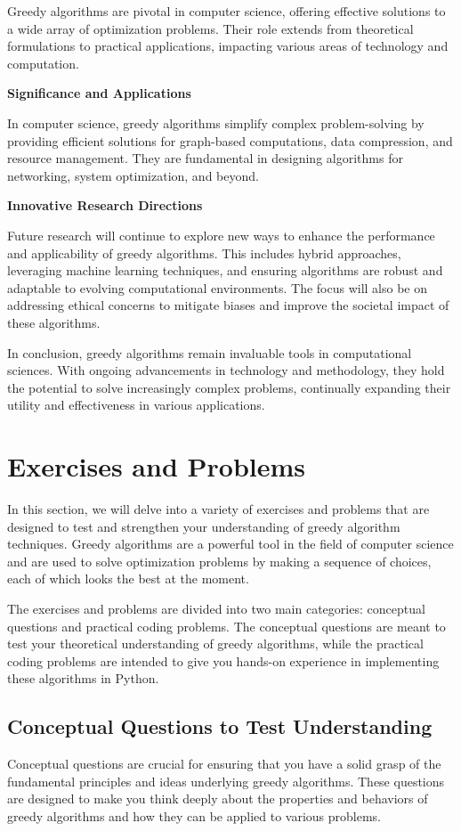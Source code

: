 \documentclass[12pt]{book} %
\begin{document}
Greedy algorithms are pivotal in computer science, offering effective solutions to a wide array of optimization problems. Their role extends from theoretical formulations to practical applications, impacting various areas of technology and computation.

\textbf{Significance and Applications}

In computer science, greedy algorithms simplify complex problem-solving by providing efficient solutions for graph-based computations, data compression, and resource management. They are fundamental in designing algorithms for networking, system optimization, and beyond.

\textbf{Innovative Research Directions}

Future research will continue to explore new ways to enhance the performance and applicability of greedy algorithms. This includes hybrid approaches, leveraging machine learning techniques, and ensuring algorithms are robust and adaptable to evolving computational environments. The focus will also be on addressing ethical concerns to mitigate biases and improve the societal impact of these algorithms.

In conclusion, greedy algorithms remain invaluable tools in computational sciences. With ongoing advancements in technology and methodology, they hold the potential to solve increasingly complex problems, continually expanding their utility and effectiveness in various applications.


\section{Exercises and Problems}
In this section, we will delve into a variety of exercises and problems that are designed to test and strengthen your understanding of greedy algorithm techniques. Greedy algorithms are a powerful tool in the field of computer science and are used to solve optimization problems by making a sequence of choices, each of which looks the best at the moment.

The exercises and problems are divided into two main categories: conceptual questions and practical coding problems. The conceptual questions are meant to test your theoretical understanding of greedy algorithms, while the practical coding problems are intended to give you hands-on experience in implementing these algorithms in Python.

\subsection{Conceptual Questions to Test Understanding}
Conceptual questions are crucial for ensuring that you have a solid grasp of the fundamental principles and ideas underlying greedy algorithms. These questions are designed to make you think deeply about the properties and behaviors of greedy algorithms and how they can be applied to various problems.
\end{document}
